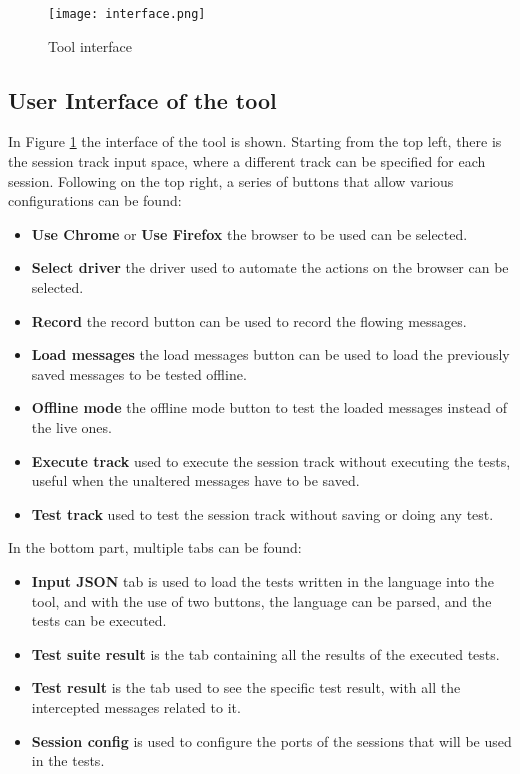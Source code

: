 \begin{figure}
    \texttt{[image: interface.png]}
    \caption{Tool interface}
    \label{fig:plugin_interface}
\end{figure}

\subsection{User Interface of the tool}
In Figure \ref{fig:plugin_interface} the interface of the tool is shown. Starting from the top left, there is the session track input space, where a different track can be specified for each session. Following on the top right, a series of buttons that allow various configurations can be found:
\begin{itemize}
    \item \textbf{Use Chrome} or \textbf{Use Firefox} the browser to be used can be selected.
    \item \textbf{Select driver} the driver used to automate the actions on the browser can be selected.
    \item \textbf{Record} the record button can be used to record the flowing messages.
    \item \textbf{Load messages} the load messages button can be used to load the previously saved messages to be tested offline.
    \item \textbf{Offline mode} the offline mode button to test the loaded messages instead of the live ones.
    \item \textbf{Execute track} used to execute the session track without executing the tests, useful when the unaltered messages have to be saved.
    \item \textbf{Test track} used to test the session track without saving or doing any test.
\end{itemize}

In the bottom part, multiple tabs can be found:
\begin{itemize}
    \item \textbf{Input JSON} tab is used to load the tests written in the language into the tool, and with the use of two buttons, the language can be parsed, and the tests can be executed.
    \item \textbf{Test suite result} is the tab containing all the results of the executed tests.
    \item \textbf{Test result} is the tab used to see the specific test result, with all the intercepted messages related to it.
    \item \textbf{Session config} is used to configure the ports of the sessions that will be used in the tests.
\end{itemize}


